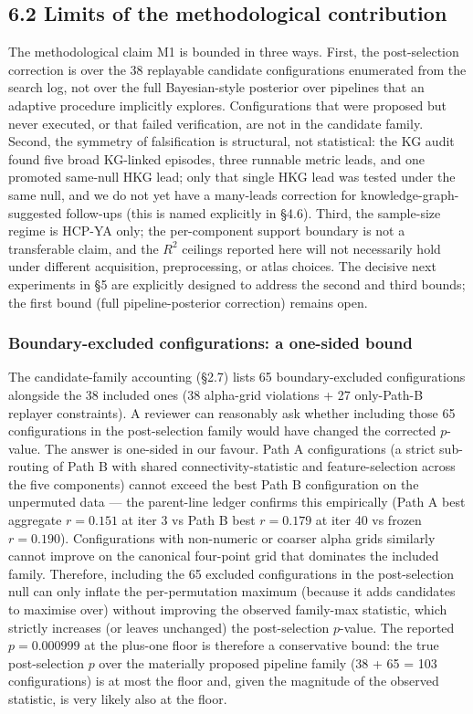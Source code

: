 \documentclass[11pt,letterpaper]{report}
\begin{document}
\subsection*{6.2 Limits of the methodological contribution}

The methodological claim M1 is bounded in three ways. First, the post-selection correction is over the 38 replayable candidate configurations enumerated from the search log, not over the full Bayesian-style posterior over pipelines that an adaptive procedure implicitly explores. Configurations that were proposed but never executed, or that failed verification, are not in the candidate family. Second, the symmetry of falsification is structural, not statistical: the KG audit found five broad KG-linked episodes, three runnable metric leads, and one promoted same-null HKG lead; only that single HKG lead was tested under the same null, and we do not yet have a many-leads correction for knowledge-graph-suggested follow-ups (this is named explicitly in \S4.6). Third, the sample-size regime is HCP-YA only; the per-component support boundary is not a transferable claim, and the $R^{2}$ ceilings reported here will not necessarily hold under different acquisition, preprocessing, or atlas choices. The decisive next experiments in \S5 are explicitly designed to address the second and third bounds; the first bound (full pipeline-posterior correction) remains open.

\subsubsection*{Boundary-excluded configurations: a one-sided bound}

The candidate-family accounting (\S2.7) lists 65 boundary-excluded configurations alongside the 38 included ones (38 alpha-grid violations + 27 only-Path-B replayer constraints). A reviewer can reasonably ask whether including those 65 configurations in the post-selection family would have changed the corrected $p$-value. The answer is one-sided in our favour. Path A configurations (a strict sub-routing of Path B with shared connectivity-statistic and feature-selection across the five components) cannot exceed the best Path B configuration on the unpermuted data --- the parent-line ledger confirms this empirically (Path A best aggregate $r = 0.151$ at iter 3 vs Path B best $r = 0.179$ at iter 40 vs frozen $r = 0.190$). Configurations with non-numeric or coarser alpha grids similarly cannot improve on the canonical four-point grid that dominates the included family. Therefore, including the 65 excluded configurations in the post-selection null can only inflate the per-permutation maximum (because it adds candidates to maximise over) without improving the observed family-max statistic, which strictly increases (or leaves unchanged) the post-selection $p$-value. The reported $p = 0.000999$ at the plus-one floor is therefore a conservative bound: the true post-selection $p$ over the materially proposed pipeline family (38 + 65 = 103 configurations) is at most the floor and, given the magnitude of the observed statistic, is very likely also at the floor.
\end{document}
